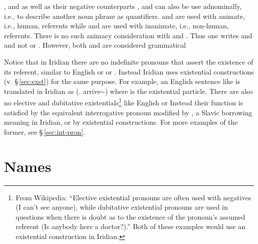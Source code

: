 ,  and  as well as their negative counterparts
,  and  can also be use adnominally, i.e., to
describe another noun phrase as quantifiers.  and  are used
with animate, i.e., human, referents while  and  are used
with inanimate, i.e., non-human, referents. There is no such animacy
consideration with  and . Thus one writes  and  and not 
or . However, both  and
 are considered grammatical

Notice that in Iridian there are no indefinite pronouns that assert the
existence of its referent, similar to English  or 
or . Instead Iridian uses existential constructions (v.
\S\,\ref{sec:exst}) for the same purpose. For example, an English sentence like
 is translated in Iridian as 
(\Refl{}.\Acc{} \Exst{} arrive-\Av{}-\Ctp{}) where  is the existential
particle. There are also no elective and dubitative existentials\footnote{From
Wikipedia: ``Elective existential pronouns are often used with negatives (I
can't see anyone), while dubitative existential pronouns are used in questions
when there is doubt as to the existence of the pronoun's assumed referent (Is
anybody here a doctor?).'' Both of these examples would use an existential
construction in Iridian.} like English  or  Instead
their function is satisfied by the equivalent interrogative pronoun modified by
, a Slavic borrowing meaning  in Iridian, or by existential
constructions. For more examples of the former, see \S\,\ref{sec:int-pron}.

\section{Names}\label{sec:names}
